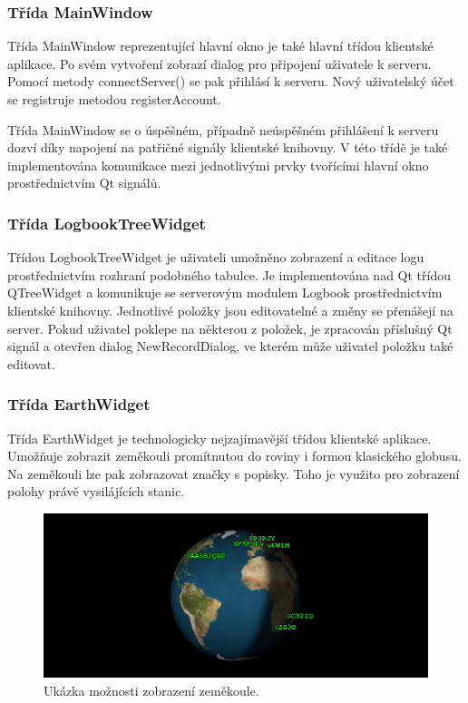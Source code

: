 \subsubsection{Třída MainWindow}

Třída MainWindow reprezentující hlavní okno je také hlavní třídou klientské aplikace. Po svém vytvoření zobrazí dialog
pro připojení uživatele k serveru. Pomocí metody connectServer() se pak přihlásí
k serveru. Nový uživatelský
účet se registruje metodou registerAccount.

Třída MainWindow se o úspěšném, případně neúspěšném přihlášení k serveru dozví díky napojení
na patřičné signály klientské knihovny. V této třídě je také implementována komunikace mezi jednotlivými prvky tvořícími hlavní okno
prostřednictvím Qt signálů.

\subsubsection{Třída LogbookTreeWidget}

Třídou LogbookTreeWidget je uživateli umožněno zobrazení a editace logu prostřednictvím rozhraní podobného tabulce.
Je implementována nad Qt třídou QTreeWidget a komunikuje 
se serverovým modulem Logbook prostřednictvím klientské knihovny. Jednotlivé položky jsou editovatelné a změny se přenášejí
na server. Pokud uživatel poklepe na některou z položek, je zpracován příslušný Qt signál a otevřen dialog NewRecordDialog,
ve kterém může uživatel položku také editovat.

\subsubsection{Třída EarthWidget}

Třída EarthWidget je technologicky nejzajímavější třídou klientské aplikace. Umožňuje zobrazit zeměkouli promítnutou do roviny i 
formou klasického globusu. Na zeměkouli lze pak zobrazovat značky s popisky. Toho je využito pro zobrazení polohy právě vysilájících
stanic.

\begin{figure}[h]
\centering
\includegraphics[trim=0cm 0cm 0cm 0cm, scale=0.9]{fig/ham5}
\caption{Ukázka možnosti zobrazení zeměkoule.}
\label{fig:FigureExample}
\end{figure}

